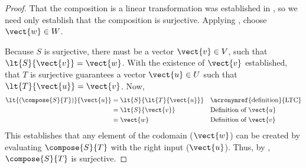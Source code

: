 %
\begin{proof}
That the composition is a linear transformation was established in , so we need only establish that the composition is surjective.  Applying , choose $\vect{w}\in W$.\par
%
Because $S$ is surjective, there must be a vector $\vect{v}\in V$, such that $\lt{S}{\vect{v}}=\vect{w}$.  With the existence of $\vect{v}$ established, that $T$ is surjective guarantees a vector $\vect{u}\in U$ such that $\lt{T}{\vect{u}}=\vect{v}$.  Now,
%
\begin{align*}
\lt{\left(\compose{S}{T}\right)}{\vect{u}}&=\lt{S}{\lt{T}{\vect{u}}}&&\text{\acronymref{definition}{LTC}}\\
&=\lt{S}{\vect{v}}&&\text{Definition of $\vect{u}$}\\
&=\vect{w}&&\text{Definition of $\vect{v}$}
\end{align*}
%
This establishes that any element of the codomain ($\vect{w}$) can be created by evaluating $\compose{S}{T}$ with the right input ($\vect{u}$).  Thus, by , $\compose{S}{T}$ is surjective.
%
\end{proof}
%
%
